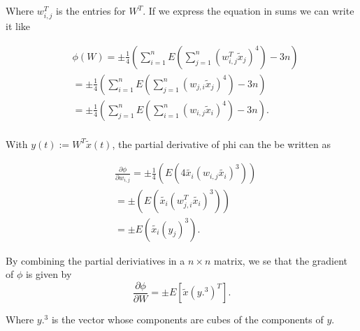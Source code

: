 Where $w_{i,j}^{T}$ is the entries for $W^{T}$. If we express the equation in sums we can write it like

\begin{equation}
\label{eq: Phi 4}
\begin{split}
&\phi \left(W\right)
 = \pm \frac{1}{4} \left( \displaystyle\sum\limits_{i=1}^n E\left(\displaystyle\sum\limits_{j=1}^n \left( w_{i,j}^{T} \tilde{x}_{j} \right)^{4} \right)-3n\right)\\
& = \pm \frac{1}{4} \left( \displaystyle\sum\limits_{i=1}^n E\left(\displaystyle\sum\limits_{j=1}^n \left( w_{j,i} \tilde{x}_{j} \right)^{4} \right)-3n\right)\\
& =\pm \frac{1}{4} \left( \displaystyle\sum\limits_{j=1}^n E\left(\displaystyle\sum\limits_{i=1}^n \left( w_{i,j} \tilde{x}_{i} \right)^{4} \right)-3n\right).\\
\end{split}
\end{equation}

With $y(t):=W^{T}\tilde{x}(t)$, the partial derivative of phi can the be written as

\begin{equation}
\label{eq: PD 1}
\begin{split}
& \frac{\partial \phi}{\partial w_{i,j}} = \pm \frac{1}{4} \left(E\left(4\tilde{x_i}\left(w_{i,j}\tilde{x_i}\right)^3\right)\right)\\
& =\pm \left(E\left(\tilde{x_i}\left(w_{j,i}^{T}\tilde{x_i}\right)^3\right)\right)\\
& = \pm E\left(\tilde{x_i}\left(y_{j}\right)^3\right).
\end{split}
\end{equation}

By combining the partial deriviatives in a $n \times n$ matrix, we se that the gradient of $\phi$ is given by
\begin{equation}
\label{eq: gardient}
\frac{\partial \phi}{\partial W}= \pm E\left[\tilde{x}\left(y.^{3}\right)^{T}\right].
\end{equation}

Where $y.^3$ is the vector whose components are cubes of the components of $y$.

\newpage

